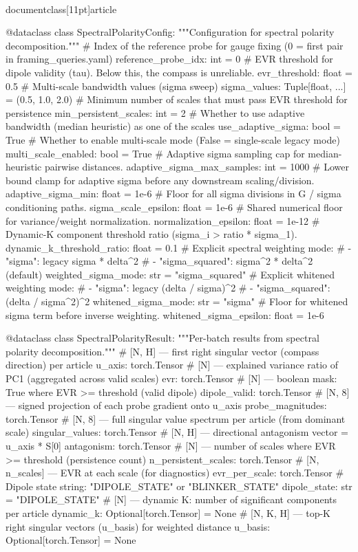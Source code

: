 \\documentclass[11pt]{article}
\begin{document}
\begin{CodeBlock}
@dataclass
class SpectralPolarityConfig:
    """Configuration for spectral polarity decomposition."""
    # Index of the reference probe for gauge fixing (0 = first pair in framing_queries.yaml)
    reference_probe_idx: int = 0
    # EVR threshold for dipole validity (tau). Below this, the compass is unreliable.
    evr_threshold: float = 0.5
    # Multi-scale bandwidth values (sigma sweep)
    sigma_values: Tuple[float, ...] = (0.5, 1.0, 2.0)
    # Minimum number of scales that must pass EVR threshold for persistence
    min_persistent_scales: int = 2
    # Whether to use adaptive bandwidth (median heuristic) as one of the scales
    use_adaptive_sigma: bool = True
    # Whether to enable multi-scale mode (False = single-scale legacy mode)
    multi_scale_enabled: bool = True
    # Adaptive sigma sampling cap for median-heuristic pairwise distances.
    adaptive_sigma_max_samples: int = 1000
    # Lower bound clamp for adaptive sigma before any downstream scaling/division.
    adaptive_sigma_min: float = 1e-6
    # Floor for all sigma divisions in G / sigma conditioning paths.
    sigma_scale_epsilon: float = 1e-6
    # Shared numerical floor for variance/weight normalization.
    normalization_epsilon: float = 1e-12
    # Dynamic-K component threshold ratio (sigma_i > ratio * sigma_1).
    dynamic_k_threshold_ratio: float = 0.1
    # Explicit spectral weighting mode:
    # - "sigma": legacy sigma * delta^2
    # - "sigma_squared": sigma^2 * delta^2 (default)
    weighted_sigma_mode: str = "sigma_squared"
    # Explicit whitened weighting mode:
    # - "sigma": legacy (delta / sigma)^2
    # - "sigma_squared": (delta / sigma^2)^2
    whitened_sigma_mode: str = "sigma"
    # Floor for whitened sigma term before inverse weighting.
    whitened_sigma_epsilon: float = 1e-6


@dataclass
class SpectralPolarityResult:
    """Per-batch results from spectral polarity decomposition."""
    # [N, H] — first right singular vector (compass direction) per article
    u_axis: torch.Tensor
    # [N] — explained variance ratio of PC1 (aggregated across valid scales)
    evr: torch.Tensor
    # [N] — boolean mask: True where EVR >= threshold (valid dipole)
    dipole_valid: torch.Tensor
    # [N, 8] — signed projection of each probe gradient onto u_axis
    probe_magnitudes: torch.Tensor
    # [N, 8] — full singular value spectrum per article (from dominant scale)
    singular_values: torch.Tensor
    # [N, H] — directional antagonism vector = u_axis * S[0]
    antagonism: torch.Tensor
    # [N] — number of scales where EVR >= threshold (persistence count)
    n_persistent_scales: torch.Tensor
    # [N, n_scales] — EVR at each scale (for diagnostics)
    evr_per_scale: torch.Tensor
    # Dipole state string: "DIPOLE_STATE" or "BLINKER_STATE"
    dipole_state: str = "DIPOLE_STATE"
    # [N] — dynamic K: number of significant components per article
    dynamic_k: Optional[torch.Tensor] = None
    # [N, K, H] — top-K right singular vectors (u_basis) for weighted distance
    u_basis: Optional[torch.Tensor] = None



\end{CodeBlock}
\end{document}
